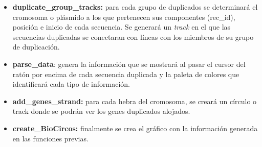 \begin{itemize}
    \item \textbf{duplicate\_group\_tracks:} para cada grupo de duplicados se determinará el cromosoma o plásmido a los que pertenecen sus componentes (rec\_id), posición e inicio de cada secuencia. Se generará un \textit{track} en el que las secuencias duplicadas se conectaran con líneas con los miembros de su grupo de duplicación.
    \item \textbf{parse\_data}: genera la información que se mostrará al pasar el cursor del ratón por encima de cada secuencia duplicada y la paleta de colores que identificará cada tipo de información.
    \item \textbf{add\_genes\_strand:} para cada hebra del cromosoma, se creará un círculo o track donde se podrán ver los genes duplicados alojados.
    \item \textbf{create\_BioCircos:} finalmente se crea el gráfico con la información generada en las funciones previas.
\end{itemize}

